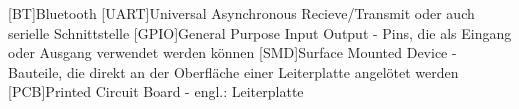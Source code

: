 
\begin{acronym}[ACRONYM]
[BT]{Bluetooth}
[UART]{Universal Asynchronous Recieve/Transmit oder auch serielle Schnittstelle}
[GPIO]{General Purpose Input Output - Pins, die als Eingang oder Ausgang verwendet werden können}
[SMD]{Surface Mounted Device - Bauteile, die direkt an der Oberfläche einer Leiterplatte angelötet werden}
[PCB]{Printed Circuit Board - engl.: Leiterplatte}
\end{acronym}\newpage

